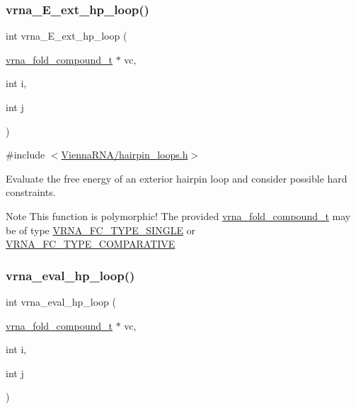 \subsubsection{\texorpdfstring{vrna\+\_\+\+E\+\_\+ext\+\_\+hp\+\_\+loop()}{vrna\_E\_ext\_hp\_loop()}}
{\footnotesize\ttfamily int vrna\+\_\+\+E\+\_\+ext\+\_\+hp\+\_\+loop (\begin{DoxyParamCaption}\item[{\hyperlink{group__fold__compound_ga1b0cef17fd40466cef5968eaeeff6166}{vrna\+\_\+fold\+\_\+compound\+\_\+t} $\ast$}]{vc,  }\item[{int}]{i,  }\item[{int}]{j }\end{DoxyParamCaption})}



{\ttfamily \#include $<$\hyperlink{hairpin__loops_8h}{Vienna\+R\+N\+A/hairpin\+\_\+loops.\+h}$>$}



Evaluate the free energy of an exterior hairpin loop and consider possible hard constraints. 

\begin{DoxyNote}{Note}
This function is polymorphic! The provided \hyperlink{group__fold__compound_ga1b0cef17fd40466cef5968eaeeff6166}{vrna\+\_\+fold\+\_\+compound\+\_\+t} may be of type \hyperlink{group__fold__compound_gga01a4ff86fa71deaaa5d1abbd95a1447da7e264dd3cf2dc9b6448caabcb7763cd6}{V\+R\+N\+A\+\_\+\+F\+C\+\_\+\+T\+Y\+P\+E\+\_\+\+S\+I\+N\+G\+LE} or \hyperlink{group__fold__compound_gga01a4ff86fa71deaaa5d1abbd95a1447dab821ce46ea3cf665be97df22a76f5023}{V\+R\+N\+A\+\_\+\+F\+C\+\_\+\+T\+Y\+P\+E\+\_\+\+C\+O\+M\+P\+A\+R\+A\+T\+I\+VE} 
\end{DoxyNote}
\mbox{\label{group__loops_gab3eb4651dc26dc2b653a57dd340d7e68}} 
\subsubsection{\texorpdfstring{vrna\+\_\+eval\+\_\+hp\+\_\+loop()}{vrna\_eval\_hp\_loop()}}
{\footnotesize\ttfamily int vrna\+\_\+eval\+\_\+hp\+\_\+loop (\begin{DoxyParamCaption}\item[{\hyperlink{group__fold__compound_ga1b0cef17fd40466cef5968eaeeff6166}{vrna\+\_\+fold\+\_\+compound\+\_\+t} $\ast$}]{vc,  }\item[{int}]{i,  }\item[{int}]{j }\end{DoxyParamCaption})}



